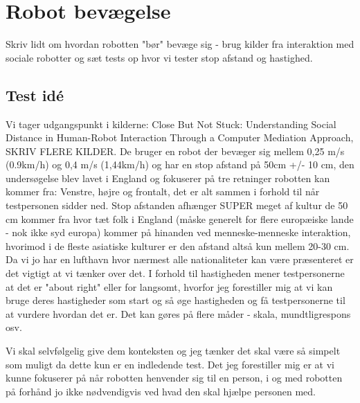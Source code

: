 \chapter{Robot bevægelse}
\label{RobotBevaegelse}
%
Skriv lidt om hvordan robotten "bør" bevæge sig - brug kilder fra interaktion med sociale robotter og sæt tests op hvor vi tester stop afstand og hastighed. \blankline
%
\section{Test idé}
%
Vi tager udgangspunkt i kilderne: Close But Not Stuck:
Understanding Social Distance in Human-Robot Interaction Through a Computer Mediation Approach, SKRIV FLERE KILDER. De bruger en robot der bevæger sig mellem 0,25 m/s (0.9km/h) og 0,4 m/s (1,44km/h) og har en stop afstand på 50cm +/- 10 cm, den undersøgelse blev lavet i England og fokuserer på tre retninger robotten kan kommer fra: Venstre, højre og frontalt, det er alt sammen i forhold til når testpersonen sidder ned. Stop afstanden afhænger SUPER meget af kultur de 50 cm kommer fra hvor tæt folk i England (måske generelt for flere europæiske lande - nok ikke syd europa) kommer på hinanden ved menneske-menneske interaktion, hvorimod i de fleste asiatiske kulturer er den afstand altså kun mellem 20-30 cm. Da vi jo har en lufthavn hvor nærmest alle nationaliteter kan være præsenteret er det vigtigt at vi tænker over det. I forhold til hastigheden mener testpersonerne at det er "about right" eller for langsomt, hvorfor jeg forestiller mig at vi kan bruge deres hastigheder som start og så øge hastigheden og få testpersonerne til at vurdere hvordan det er. Det kan gøres på flere måder - skala, mundtligrespons osv. 

Vi skal selvfølgelig give dem konteksten og jeg tænker det skal være så simpelt som muligt da dette kun er en indledende test. Det jeg forestiller mig er at vi kunne fokuserer på når robotten henvender sig til en person, i og med robotten på forhånd jo ikke nødvendigvis ved hvad den skal hjælpe personen med. 

